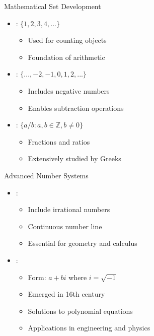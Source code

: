 \begin{frame}{Mathematical Set Development}
\begin{itemize}
\item {}: $\{1, 2, 3, 4, ...\}$
\begin{itemize}
\item Used for counting objects
\item Foundation of arithmetic
\end{itemize}
\vspace{0.3cm}
\item {}: $\{..., -2, -1, 0, 1, 2, ...\}$
\begin{itemize}
\item Includes negative numbers
\item Enables subtraction operations
\end{itemize}
\vspace{0.3cm}
\item {}: $\{a/b : a,b \in \mathbb{Z}, b \neq 0\}$
\begin{itemize}
\item Fractions and ratios
\item Extensively studied by Greeks
\end{itemize}
\end{itemize}
\end{frame}

\begin{frame}{Advanced Number Systems}
\begin{itemize}
\item {}:
\begin{itemize}
\item Include irrational numbers
\item Continuous number line
\item Essential for geometry and calculus
\end{itemize}
\vspace{0.5cm}
\item {}:
\begin{itemize}
\item Form: $a + bi$ where $i = \sqrt{-1}$
\item Emerged in 16th century
\item Solutions to polynomial equations
\item Applications in engineering and physics
\end{itemize}
\end{itemize}
\end{frame}

